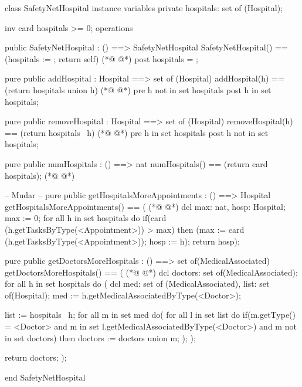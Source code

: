 \begin{vdmpp}[breaklines=true]
class SafetyNetHospital
instance variables
 private hospitals: set of (Hospital);
 
 inv card hospitals >= 0;
operations

 public SafetyNetHospital : () ==> SafetyNetHospital
  SafetyNetHospital() == (hospitals := {}; return self)
(*@
\label{SafetyNetHospital:10}
@*)
 post hospitals = {};
  
 pure public addHospital : Hospital ==> set of (Hospital)
  addHospital(h) == (return hospitals union {h})
(*@
\label{addHospital:14}
@*)
 pre h not in set hospitals
 post h in set hospitals;
 
 pure public removeHospital : Hospital ==> set of (Hospital)
  removeHospital(h) == (return hospitals \ {h})
(*@
\label{removeHospital:19}
@*)
 pre h in set hospitals
 post h not in set hospitals;
 
 pure public numHospitals : () ==> nat
  numHospitals() == (return card hospitals);
(*@
\label{numHospitals:24}
@*)
 
 -- Mudar -- 
 pure public getHospitalsMoreAppointments : () ==> Hospital
  getHospitalsMoreAppointments() == (
(*@
\label{getHospitalsMoreAppointments:28}
@*)
                    dcl max: nat, hosp: Hospital;
                    max := 0;
                    for all h in set hospitals do
                     if(card (h.getTasksByType(<Appointment>)) > max)
                      then (max := card (h.getTasksByType(<Appointment>)); hosp := h);
                    return hosp);
 
 pure public getDoctorsMoreHospitals : () ==> set of(MedicalAssociated)
  getDoctorsMoreHospitals() == (
(*@
\label{getDoctorsMoreHospitals:37}
@*)
                  dcl doctors: set of(MedicalAssociated);
                  for all h in set hospitals do (
                   dcl med: set of (MedicalAssociated), list: set of(Hospital);
                   med := h.getMedicalAssociatedByType(<Doctor>);
                   
                   list := hospitals \ {h};
                   for all m in set med do(
                    for all l in set list do
                     if(m.getType() = <Doctor> and m in set l.getMedicalAssociatedByType(<Doctor>) and m not in set doctors)
                      then doctors := doctors union {m};
                   );
                  );
                  
                  return doctors;
                 );              
  
end SafetyNetHospital
\end{vdmpp}
